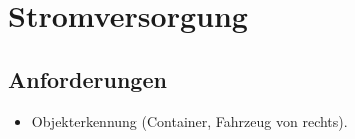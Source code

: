 \section{Stromversorgung}

\subsection {Anforderungen}
\begin{itemize}
\item Objekterkennung (Container, Fahrzeug von rechts).

\end{itemize}

